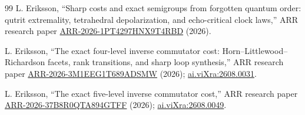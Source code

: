 \documentclass[11pt]{article}
\theoremstyle{definition}
\theoremstyle{remark}
\newcommand{\1}{\mathbf 1}
\begin{document}
\begin{thebibliography}{99}
L. Eriksson,
``Sharp costs and exact semigroups from forgotten quantum order: qutrit extremality, tetrahedral depolarization, and echo-critical clock laws,''
ARR research paper \href{https://arr-research.github.io/papers/ARR-2026-1PT4297HNX9T4RBD/}{ARR-2026-1PT4297HNX9T4RBD} (2026).

L. Eriksson,
``The exact four-level inverse commutator cost: Horn--Littlewood--Richardson facets, rank transitions, and sharp loop synthesis,''
ARR research paper \href{https://arr-research.github.io/papers/ARR-2026-3M1EEG1T689ADSMW/}{ARR-2026-3M1EEG1T689ADSMW} (2026); \href{https://ai.vixra.org/abs/2608.0031}{ai.viXra:2608.0031}.

L. Eriksson,
``The exact five-level inverse commutator cost,''
ARR research paper \href{https://arr-research.github.io/papers/ARR-2026-37B8R0QTA894GTFF/}{ARR-2026-37B8R0QTA894GTFF} (2026); \href{https://ai.vixra.org/abs/2608.0049}{ai.viXra:2608.0049}.

\end{thebibliography}
\end{document}
